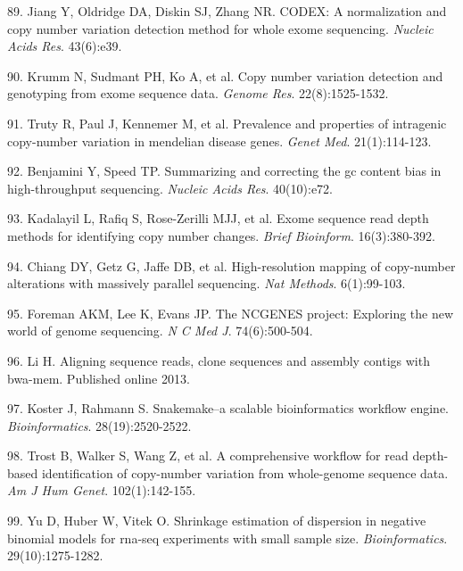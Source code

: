 \documentclass[11pt,letterpaper]{book}
\begin{document}
\leavevmode\hypertarget{ref-jiang:2015aa}{}%
89. Jiang Y, Oldridge DA, Diskin SJ, Zhang NR. CODEX: A normalization and copy number variation detection method for whole exome sequencing. \emph{Nucleic Acids Res}. 43(6):e39.

\leavevmode\hypertarget{ref-krumm:2012aa}{}%
90. Krumm N, Sudmant PH, Ko A, et al. Copy number variation detection and genotyping from exome sequence data. \emph{Genome Res}. 22(8):1525-1532.

\leavevmode\hypertarget{ref-truty:2019aa}{}%
91. Truty R, Paul J, Kennemer M, et al. Prevalence and properties of intragenic copy-number variation in mendelian disease genes. \emph{Genet Med}. 21(1):114-123.

\leavevmode\hypertarget{ref-benjamini:2012aa}{}%
92. Benjamini Y, Speed TP. Summarizing and correcting the gc content bias in high-throughput sequencing. \emph{Nucleic Acids Res}. 40(10):e72.

\leavevmode\hypertarget{ref-kadalayil:2015aa}{}%
93. Kadalayil L, Rafiq S, Rose-Zerilli MJJ, et al. Exome sequence read depth methods for identifying copy number changes. \emph{Brief Bioinform}. 16(3):380-392.

\leavevmode\hypertarget{ref-chiang:2009aa}{}%
94. Chiang DY, Getz G, Jaffe DB, et al. High-resolution mapping of copy-number alterations with massively parallel sequencing. \emph{Nat Methods}. 6(1):99-103.

\leavevmode\hypertarget{ref-foreman:2013aa}{}%
95. Foreman AKM, Lee K, Evans JP. The NCGENES project: Exploring the new world of genome sequencing. \emph{N C Med J}. 74(6):500-504.

\leavevmode\hypertarget{ref-li:2013ab}{}%
96. Li H. Aligning sequence reads, clone sequences and assembly contigs with bwa-mem. Published online 2013.

\leavevmode\hypertarget{ref-koster:2012aa}{}%
97. Koster J, Rahmann S. Snakemake--a scalable bioinformatics workflow engine. \emph{Bioinformatics}. 28(19):2520-2522.

\leavevmode\hypertarget{ref-trost:2018aa}{}%
98. Trost B, Walker S, Wang Z, et al. A comprehensive workflow for read depth-based identification of copy-number variation from whole-genome sequence data. \emph{Am J Hum Genet}. 102(1):142-155.

\leavevmode\hypertarget{ref-yu:2013aa}{}%
99. Yu D, Huber W, Vitek O. Shrinkage estimation of dispersion in negative binomial models for rna-seq experiments with small sample size. \emph{Bioinformatics}. 29(10):1275-1282.
\end{document}
